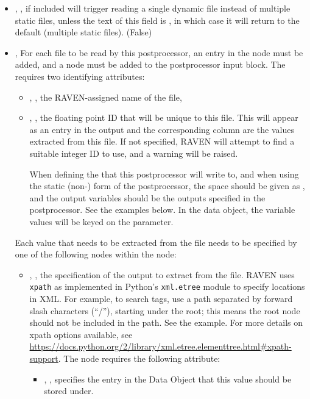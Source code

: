 \begin{itemize}
  \item {}, , if included will trigger reading a single dynamic
  file instead of multiple static files, unless the text of this field is , in which case it
  will return to the default (multiple static files).  (False)
  \item {}, 
  For each file to be read by this postprocessor, an entry in the  node must be added, and a
   node must be added to the postprocessor input block.  The  requires two
  identifying attributes:
  \begin{itemize}
    \item {}, , the RAVEN-assigned name of the file,
    \item {}, , the floating point ID that will be unique to this
      file.  This will appear as an entry in the output  and the corresponding column are
      the values extracted from this file.  If not specified, RAVEN will attempt to find a suitable integer ID
      to use, and a warning will be raised.

      When defining the  that this postprocessor will write to, and when using the static
      (non-) form of the postprocessor, the  space should be given as
      , and the output variables should be the outputs specified in the postprocessor. See the
      examples below.  In the data object, the variable values will be keyed on the  parameter.
  \end{itemize}
  Each value that needs to be extracted from the file needs to be specified by one of the following
   nodes within the  node:
  \begin{itemize}
    \item {}, ,
           the specification of the output to extract from the file.
           RAVEN uses \texttt{xpath} as implemented in Python's \texttt{xml.etree} module to specify locations
           in XML.  For example, to search tags, use a path
           separated by forward slash characters (``/''), starting under the root; this means the root node should not
           be included in the path. See the example.  For more details on xpath options available, see
           \url{https://docs.python.org/2/library/xml.etree.elementtree.html#xpath-support}.
           The  node requires the following attribute:
      \begin{itemize}
        \item {}, , specifies the entry in the Data Object that
          this value should be stored under.
      \end{itemize}

  \end{itemize}
\end{itemize}

